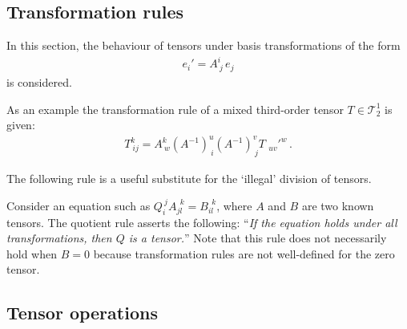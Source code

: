 \subsection{Transformation rules}

    In this section, the behaviour of tensors under basis transformations of the form
    \begin{gather}
        e_i'=A^i_{\ j}\,e_j
    \end{gather}
    is considered.

    \begin{example}
        As an example the transformation rule of a mixed third-order tensor $T\in\mathcal{T}^1_2$ is given:
        \begin{gather}
            T_{\ ij}^k = A^k_{\ w}(A^{-1})^u_{\ i}(A^{-1})^v_{\ j}T_{\ \ uv}'^w\,.
        \end{gather}
    \end{example}

    The following rule is a useful substitute for the `illegal' division of tensors.
    \begin{method}
        Consider an equation such as $Q_i^{\ j}A_{jl}^{\ \ k}=B_{il}^{\ \ k}$, where $A$ and $B$ are two known tensors. The quotient rule asserts the following: ``\textit{If the equation holds under all transformations, then $Q$ is a tensor.}'' Note that this rule does not necessarily hold when $B=0$ because transformation rules are not well-defined for the zero tensor.
    \end{method}

\subsection{Tensor operations}

